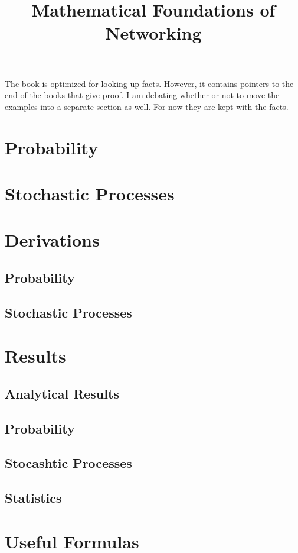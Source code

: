 \documentclass[letterpaper,12pt]{article}
\title{Mathematical Foundations of Networking}
\begin{document}
\raggedright

\setlength{\columnseprule}{0.5pt}
\setcounter{tocdepth}{4}
\setcounter{secnumdepth}{6}
\tableofcontents

The book is optimized for looking up facts. However, it contains pointers to the
end of the books that give proof. I am debating whether or not to move the
examples into a separate section as well. For now they are kept with the facts. 

\newpage
\section{Probability}


\newpage
\section{Stochastic Processes}


\newpage
\section{Derivations}
\subsection{Probability}

\subsection{Stochastic Processes}


\newpage
\section{Results}
\subsection{Analytical Results}

\subsection{Probability}

\subsection{Stocashtic Processes}

\subsection{Statistics}



\newpage
\section{Useful Formulas}

\end{document}
